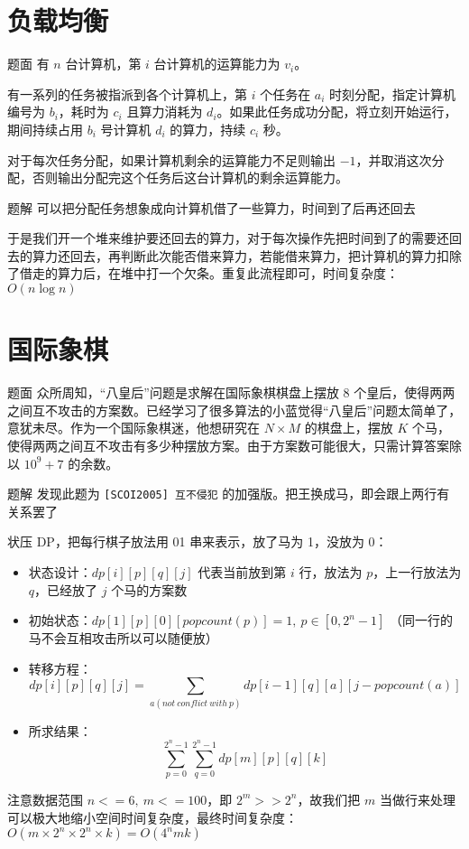 \documentclass{pptt}
\begin{document}
\section{负载均衡}

\begin{frame}{题面}
    有 $n$ 台计算机，第 $i$ 台计算机的运算能力为 $v_i$。

    有一系列的任务被指派到各个计算机上，第 $i$ 个任务在 $a_i$ 时刻分配，指定计算机编号为 $b_i$，耗时为 $c_i$ 且算力消耗为 $d_i$。如果此任务成功分配，将立刻开始运行，期间持续占用 $b_i$ 号计算机 $d_i$ 的算力，持续 $c_i$ 秒。

    对于每次任务分配，如果计算机剩余的运算能力不足则输出 $-1$，并取消这次分配，否则输出分配完这个任务后这台计算机的剩余运算能力。
\end{frame}

\begin{frame}{题解}
    可以把分配任务想象成向计算机借了一些算力，时间到了后再还回去

    于是我们开一个堆来维护要还回去的算力，对于每次操作先把时间到了的需要还回去的算力还回去，再判断此次能否借来算力，若能借来算力，把计算机的算力扣除了借走的算力后，在堆中打一个欠条。重复此流程即可，时间复杂度：$O(n\log{n})$
\end{frame}

\section{国际象棋}

\begin{frame}{题面}
    众所周知，“八皇后”问题是求解在国际象棋棋盘上摆放 $8$ 个皇后，使得两两之间互不攻击的方案数。已经学习了很多算法的小蓝觉得“八皇后”问题太简单了，意犹未尽。作为一个国际象棋迷，他想研究在 $N \times M$ 的棋盘上，摆放 $K$ 个马，使得两两之间互不攻击有多少种摆放方案。由于方案数可能很大，只需计算答案除以 ${10}^9+7$ 的余数。
\end{frame}

\begin{frame}{题解}
    发现此题为 \texttt{[SCOI2005] 互不侵犯} 的加强版。把王换成马，即会跟上两行有关系罢了

    状压 DP，把每行棋子放法用 01 串来表示，放了马为 1，没放为 0：

    \begin{itemize}
        \item 状态设计：$dp[i][p][q][j]$ 代表当前放到第 $i$ 行，放法为 $p$，上一行放法为 $q$，已经放了 $j$ 个马的方案数
        \item 初始状态：$dp[1][p][0][popcount(p)] = 1,~p \in [0, 2^n-1]$ {\scriptsize （同一行的马不会互相攻击所以可以随便放）}
        \item 转移方程：$$dp[i][p][q][j] = \sum_{a(not\ conflict\ with\ p)} dp[i-1][q][a][j-popcount(a)]$$
        \item 所求结果：$$\sum_{p=0}^{2^n-1} \sum_{q=0}^{2^n-1} dp[m][p][q][k]$$
    \end{itemize}

    注意数据范围 $n<=6,~m<=100$，即 $2^m >> 2^n$，故我们把 $m$ 当做行来处理可以极大地缩小空间时间复杂度，最终时间复杂度：$O(m \times 2^n \times 2^n \times k) = O(4^nmk)$
\end{frame}
\end{document}
